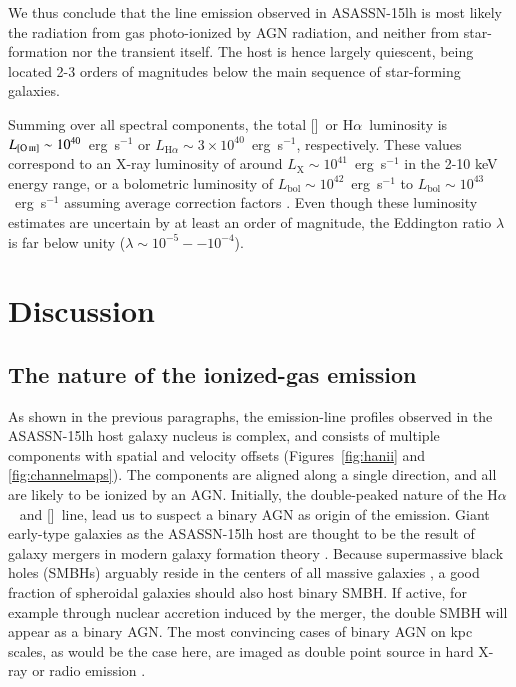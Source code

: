 \documentclass[traditabstract]{aa}
\newcommand{\ha}{H$\alpha$}
\newcommand{\oiii}{[\ion{O}{iii}]}
\newcommand{\nii}{[\ion{N}{ii}]}
\begin{document}
We thus conclude that the line emission observed in ASASSN-15lh is most likely the radiation from gas photo-ionized by AGN radiation, and neither from star-formation nor the transient itself. The host is hence largely quiescent, being located 2-3 orders of magnitudes below the main sequence of star-forming galaxies.

Summing over all spectral components, the total \oiii~or \ha~luminosity is $L_{\oiii}\sim10^{40}$~erg~s$^{-1}$ or $L_{\mathrm{H}\alpha} \sim 3 \times 10^{40}$~erg~s$^{-1}$, respectively. These values correspond to an X-ray luminosity of around $L_{\mathrm{X}}\sim10^{41}$~erg~s$^{-1}$ in the 2-10 keV energy range, or a bolometric luminosity of $L_{\mathrm{bol}}\sim10^{42}$~erg~s$^{-1}$ to $L_{\mathrm{bol}}\sim10^{43}$~erg~s$^{-1}$ assuming average correction factors \citep{2008ARA&A..46..475H, 2009A&A...504...73L, 2012MNRAS.425..623L}. Even though these luminosity estimates are uncertain by at least an order of magnitude, the Eddington ratio $\lambda$ is far below unity ($\lambda\sim10^{-5}--10^{-4}$).

\section{Discussion}
\label{sec:Disc}

\subsection{The nature of the ionized-gas emission}

As shown in the previous paragraphs, the emission-line profiles observed in the ASASSN-15lh host galaxy nucleus is complex, and consists of multiple components with spatial and velocity offsets (Figures~\ref{fig:hanii} and \ref{fig:channelmaps}). The components are aligned along a single direction, and all are likely to be ionized by an AGN. Initially, the double-peaked nature of the \ha~ and \nii~line, lead us to suspect a binary AGN as origin of the emission. Giant early-type galaxies as the ASASSN-15lh host are thought to be the result of galaxy mergers in modern galaxy formation theory \citep[e.g.,][and references therein]{2006ApJS..163....1H}. Because supermassive black holes (SMBHs) arguably reside in the centers of all massive galaxies \citep[e.g.,][for a review]{2013ARA&A..51..511K}, a good fraction of spheroidal galaxies should also host binary SMBH. If active, for example through nuclear accretion induced by the merger, the double SMBH will appear as a binary AGN. The most convincing cases of binary AGN on kpc scales, as would be the case here, are imaged as double point source in hard X-ray \citep[e.g.,][]{2003ApJ...582L..15K, 2008MNRAS.386..105B} or radio emission \citep{2011ApJ...740L..44F, 2015ApJ...813..103M}.
\end{document}
